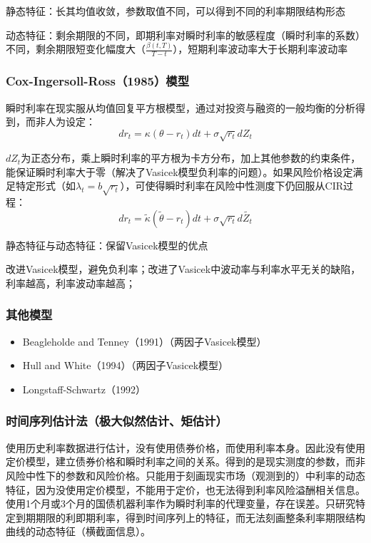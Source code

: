 \documentclass[11pt]{article}
\begin{document}
静态特征：长其均值收敛，参数取值不同，可以得到不同的利率期限结构形态

动态特征：剩余期限的不同，即期利率对瞬时利率的敏感程度（瞬时利率的系数）不同，剩余期限短变化幅度大（$\tfrac{\beta(t,T)}{T-t}$），短期利率波动率大于长期利率波动率

\subsubsection{Cox-Ingersoll-Ross（1985）模型}

瞬时利率在现实服从均值回复平方根模型，通过对投资与融资的一般均衡的分析得到，而非人为设定：
\begin{equation*}
	dr_t = \kappa(\theta-r_t)dt+\sigma\sqrt{r_t} dZ_t
\end{equation*}

$dZ_t$为正态分布，乘上瞬时利率的平方根为卡方分布，加上其他参数的约束条件，能保证瞬时利率大于零（解决了Vasicek模型负利率的问题）。如果风险价格设定满足特定形式（如$\lambda_t=b\sqrt{r_t}$），可使得瞬时利率在风险中性测度下仍回服从CIR过程：
\begin{equation*}
	dr_t = \tilde{\kappa}(\tilde{\theta}-r_t)dt+\sigma\sqrt{r_t} d\tilde{Z_t}
\end{equation*}

静态特征与动态特征：保留Vasicek模型的优点

改进Vasicek模型，避免负利率；改进了Vasicek中波动率与利率水平无关的缺陷，利率越高，利率波动率越高；

\subsubsection{其他模型}

\begin{itemize}
    \item Beagleholde and Tenney（1991）（两因子Vasicek模型）
    \item Hull and White（1994）（两因子Vasicek模型）
    \item Longstaff-Schwartz（1992）
\end{itemize}

\subsubsection{时间序列估计法（极大似然估计、矩估计）}

使用历史利率数据进行估计，没有使用债券价格，而使用利率本身。因此没有使用定价模型，建立债券价格和瞬时利率之间的关系。得到的是现实测度的参数，而非风险中性下的参数和风险价格。只能用于刻画现实市场（观测到的）中利率的动态特征，因为没使用定价模型，不能用于定价，也无法得到利率风险溢酬相关信息。使用1个月或3个月的国债机器利率作为瞬时利率的代理变量，存在误差。只研究特定到期期限的利即期利率，得到时间序列上的特征，而无法刻画整条利率期限结构曲线的动态特征（横截面信息）。
\end{document}
